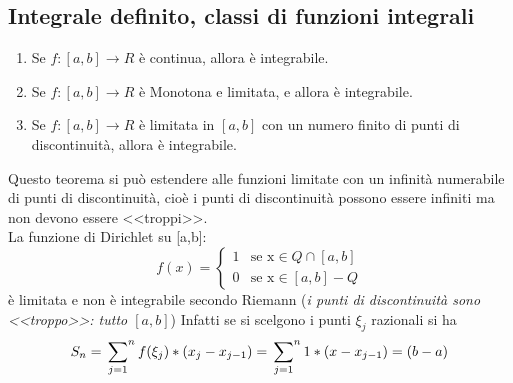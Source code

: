 \subsection{Integrale definito, classi di funzioni integrali}
\begin{enumerate}
	\item Se $f:[a,b]\to R$ è continua, allora è integrabile.
	\item Se $f:[a,b]\to R$ è Monotona e limitata, e allora è integrabile.
	\item Se $f:[a,b]\to R$ è limitata in $[a,b]$ con un numero finito di punti di discontinuità, allora è integrabile.
\end{enumerate}
Questo teorema si può estendere alle funzioni limitate con un infinità numerabile di punti di discontinuità, cioè i punti di discontinuità possono essere infiniti ma non devono essere <<troppi>>.\\
La funzione di Dirichlet su [a,b]:
\begin{equation*}
f(x)=\begin{cases}
		1 &\text{se x}\in Q \cap [a,b]\\
		0&\text{se x}\in [a,b] -Q
	\end{cases}
\end{equation*}
è limitata e non è integrabile secondo Riemann (\textit{i punti di discontinuità sono <<troppo>>: tutto $[a,b]$}) Infatti se si scelgono i punti $\xi_j$ razionali si ha
\begin{equation*}
	S_n=\sideset{}{^n}\sum_{j=1}f(\xi_j)*(x_j-x_{j-1})=\sideset{}{^n}\sum_{j=1}1*(x-x_{j-1})=(b-a)
\end{equation*} 
